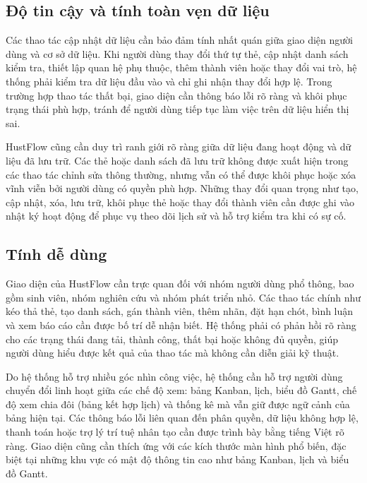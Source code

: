 \documentclass[../DoAn.tex]{subfiles}
\begin{document}
\subsection{Độ tin cậy và tính toàn vẹn dữ liệu}
\label{subsection:2.4.3}

Các thao tác cập nhật dữ liệu cần bảo đảm tính nhất quán giữa giao diện người dùng và cơ sở dữ liệu. Khi người dùng thay đổi thứ tự thẻ, cập nhật danh sách kiểm tra, thiết lập quan hệ phụ thuộc, thêm thành viên hoặc thay đổi vai trò, hệ thống phải kiểm tra dữ liệu đầu vào và chỉ ghi nhận thay đổi hợp lệ. Trong trường hợp thao tác thất bại, giao diện cần thông báo lỗi rõ ràng và khôi phục trạng thái phù hợp, tránh để người dùng tiếp tục làm việc trên dữ liệu hiển thị sai.

HustFlow cũng cần duy trì ranh giới rõ ràng giữa dữ liệu đang hoạt động và dữ liệu đã lưu trữ. Các thẻ hoặc danh sách đã lưu trữ không được xuất hiện trong các thao tác chỉnh sửa thông thường, nhưng vẫn có thể được khôi phục hoặc xóa vĩnh viễn bởi người dùng có quyền phù hợp. Những thay đổi quan trọng như tạo, cập nhật, xóa, lưu trữ, khôi phục thẻ hoặc thay đổi thành viên cần được ghi vào nhật ký hoạt động để phục vụ theo dõi lịch sử và hỗ trợ kiểm tra khi có sự cố.

\subsection{Tính dễ dùng}
\label{subsection:2.4.4}

Giao diện của HustFlow cần trực quan đối với nhóm người dùng phổ thông, bao gồm sinh viên, nhóm nghiên cứu và nhóm phát triển nhỏ. Các thao tác chính như kéo thả thẻ, tạo danh sách, gán thành viên, thêm nhãn, đặt hạn chót, bình luận và xem báo cáo cần được bố trí dễ nhận biết. Hệ thống phải có phản hồi rõ ràng cho các trạng thái đang tải, thành công, thất bại hoặc không đủ quyền, giúp người dùng hiểu được kết quả của thao tác mà không cần diễn giải kỹ thuật.

Do hệ thống hỗ trợ nhiều góc nhìn công việc, hệ thống cần hỗ trợ người dùng chuyển đổi linh hoạt giữa các chế độ xem: bảng Kanban, lịch, biểu đồ Gantt, chế độ xem chia đôi (bảng kết hợp lịch) và thống kê mà vẫn giữ được ngữ cảnh của bảng hiện tại. Các thông báo lỗi liên quan đến phân quyền, dữ liệu không hợp lệ, thanh toán hoặc trợ lý trí tuệ nhân tạo cần được trình bày bằng tiếng Việt rõ ràng. Giao diện cũng cần thích ứng với các kích thước màn hình phổ biến, đặc biệt tại những khu vực có mật độ thông tin cao như bảng Kanban, lịch và biểu đồ Gantt.
\end{document}
